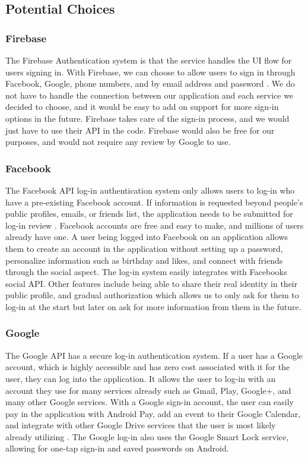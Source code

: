 \documentclass[onecolumn, draftclsnofoot,10pt, compsoc]{IEEEtran}
\begin{document}
\subsection{Potential Choices}

\subsubsection{Firebase}
The Firebase Authentication system is that the service handles the UI flow for users signing in. With Firebase, we can choose to allow users to sign in through Facebook, Google, phone numbers, and by email address and password \cite{firebase}. We do not have to handle the connection between our application and each service we decided to choose, and it would be easy to add on support for more sign-in options in the future. Firebase takes care of the sign-in process, and we would just have to use their API in the code. Firebase would also be free for our purposes, and would not require any review by Google to use.

\subsubsection{Facebook}
The Facebook API log-in authentication system only allows users to log-in who have a pre-existing Facebook account. If information is requested beyond people's public profiles, emails, or friends list, the application needs to be submitted for log-in review \cite{facebook}. Facebook accounts are free and easy to make, and millions of users already have one. A user being logged into Facebook on an application allows them to create an account in the application without setting up a password, personalize information such as birthday and likes, and connect with friends through the social aspect. The log-in system easily integrates with Facebooks social API. Other features include being able to share their real identity in their public profile, and gradual authorization which allows us to only ask for them to log-in at the start but later on ask for more information from them in the future.

\subsubsection{Google}
The Google API has a secure log-in authentication system. If a user has a Google account, which is highly accessible and has zero cost associated with it for the user, they can log into the application. It allows the user to log-in with an account they use for many services already such as Gmail, Play, Google+, and many other Google services. With a Google sign-in account, the user can easily pay in the application with Android Pay, add an event to their Google Calendar, and integrate with other Google Drive services that the user is most likely already utilizing \cite{google}. The Google log-in also uses the Google Smart Lock service, allowing for one-tap sign-in and saved passwords on Android.
\end{document}
